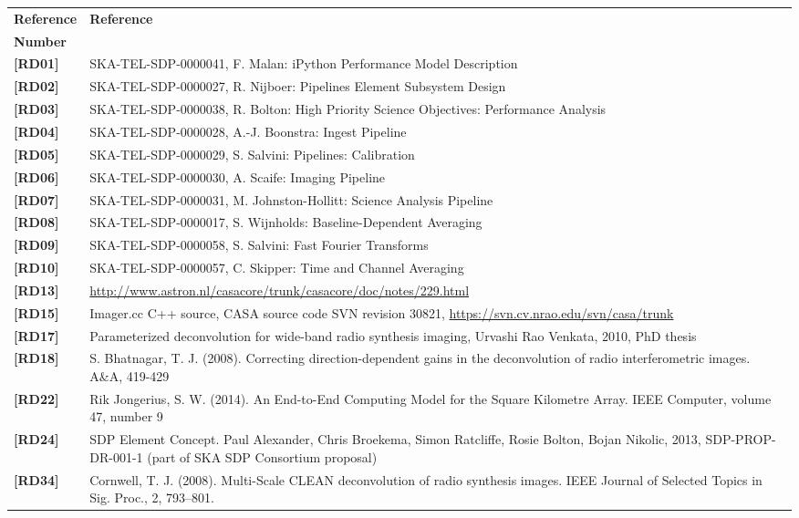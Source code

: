 \documentclass[11pt,a4paper,variablewidth]{article}
\begin{document}
 \begin{center}
 \begin{tabularx}{\textwidth}{|l|X|}
     \hline
     \bf{Reference} & \bf{Reference}\\
     \bf{Number} & \\
     \hline
   {\bf [RD01]} & SKA-TEL-SDP-0000041, F. Malan: iPython Performance Model Description\\
   {\bf [RD02]} & SKA-TEL-SDP-0000027, R. Nijboer: Pipelines Element Subsystem Design\\
   {\bf [RD03]} & SKA-TEL-SDP-0000038, R. Bolton: High Priority Science Objectives: Performance Analysis\\
   {\bf [RD04]} & SKA-TEL-SDP-0000028, A.-J. Boonstra: Ingest Pipeline\\
   {\bf [RD05]} & SKA-TEL-SDP-0000029, S. Salvini: Pipelines: Calibration\\
   {\bf [RD06]} & SKA-TEL-SDP-0000030, A. Scaife: Imaging Pipeline\\
   {\bf [RD07]} & SKA-TEL-SDP-0000031, M. Johnston-Hollitt: Science Analysis Pipeline\\
   {\bf [RD08]} & SKA-TEL-SDP-0000017, S. Wijnholds: Baseline-Dependent Averaging\\
   {\bf [RD09]} & SKA-TEL-SDP-0000058, S. Salvini: Fast Fourier Transforms\\
   {\bf [RD10]} & SKA-TEL-SDP-0000057, C. Skipper: Time and Channel Averaging\\
   {\bf [RD13]} & \url{http://www.astron.nl/casacore/trunk/casacore/doc/notes/229.html}\\
   {\bf [RD15]} & Imager.cc C++ source, CASA source code SVN revision 30821, \url{https://svn.cv.nrao.edu/svn/casa/trunk}\\ 
   {\bf [RD17]} & Parameterized deconvolution for wide-band radio synthesis imaging, Urvashi Rao Venkata, 2010, PhD thesis\\
   {\bf [RD18]} & S. Bhatnagar, T. J. (2008). Correcting direction-dependent gains in the deconvolution of radio interferometric images. A\&A, 419-429\\
   {\bf [RD22]} & Rik Jongerius, S. W. (2014). An End-to-End Computing Model for the Square Kilometre Array. IEEE Computer, volume 47, number 9\\
   {\bf [RD24]} & SDP Element Concept. Paul Alexander, Chris Broekema, Simon Ratcliffe, Rosie Bolton, Bojan Nikolic, 2013, SDP-PROP-DR-001-1 (part of SKA SDP Consortium proposal)\\
   {\bf [RD34]} & Cornwell, T. J. (2008). Multi-Scale CLEAN deconvolution of radio synthesis images. IEEE Journal of Selected Topics in Sig. Proc., 2, 793–801.\\

\end{tabularx}
\end{center}
\end{document}
